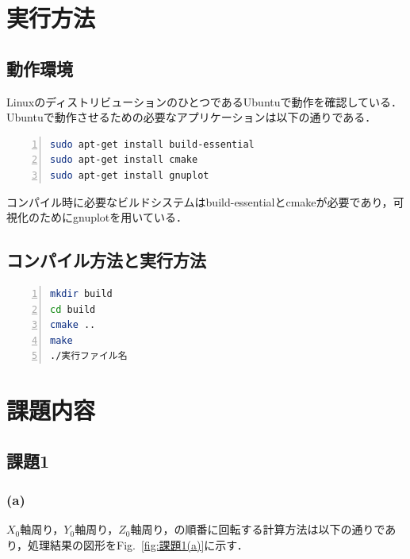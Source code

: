 \documentclass[a4paper,10pt]{jsarticle}
\begin{document}
\section{実行方法}
\subsection{動作環境}
LinuxのディストリビューションのひとつであるUbuntuで動作を確認している．
Ubuntuで動作させるための必要なアプリケーションは以下の通りである．

\begin{lstlisting}[basicstyle=\ttfamily\footnotesize, language=Bash, frame=single, firstnumber=1, numbers=left, breaklines=true]
sudo apt-get install build-essential
sudo apt-get install cmake
sudo apt-get install gnuplot
\end{lstlisting}

コンパイル時に必要なビルドシステムはbuild-essentialとcmakeが必要であり，可視化のためにgnuplotを用いている．

\subsection{コンパイル方法と実行方法}

\begin{lstlisting}[basicstyle=\ttfamily\footnotesize, language=Bash, frame=single, firstnumber=1, numbers=left, breaklines=true]
mkdir build
cd build
cmake ..
make
./実行ファイル名
\end{lstlisting}

\section{課題内容}
\subsection{課題1}
\subsubsection{(a)}
$X_0$軸周り，$Y_0$軸周り，$Z_0$軸周り，の順番に回転する計算方法は以下の通りであり，処理結果の図形をFig.~\ref{fig:課題1(a)}に示す．
\end{document}
